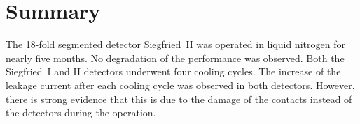 \section{Summary}
\label{sec:ii:sum}

The 18-fold segmented detector Siegfried~II was operated in liquid
nitrogen for nearly five months. No degradation of the performance was
observed. Both the Siegfried~I and II detectors underwent four cooling
cycles. The increase of the leakage current after each cooling cycle
was observed in both detectors. However, there is strong evidence that
this is due to the damage of the contacts instead of the detectors
during the operation.


